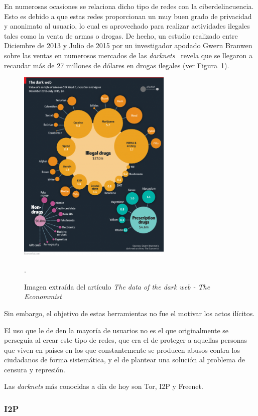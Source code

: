 En numerosas ocasiones se relaciona dicho tipo de redes con la ciberdelincuencia. Esto es debido a que estas redes proporcionan un muy buen grado de privacidad y anonimato al usuario, lo cual es aprovechado para realizar actividades ilegales tales como la venta de armas o drogas. 
De hecho, un estudio realizado entre Diciembre de 2013 y Julio de 2015 por un investigador apodado Gwern Branwen sobre las ventas en numerosos mercados de las \textit{darknets}~\cite{article:gwern} revela que se llegaron a recaudar más de 27 millones de dólares en drogas ilegales (ver Figura~\ref{fig:gwern}).

\begin{figure}[h]
	\centerline{
		\mbox{\includegraphics[width=2.90in]{images/darknet_markets.png}}
	}
	\caption{Imagen extraída del artículo \textit{The data of the dark web - The Econommist}~\cite{article:gwern}}.
	\label{fig:gwern}
\end{figure}

Sin embargo, el objetivo de estas herramientas no fue el motivar los actos ilícitos. 

El uso que le de den la mayoría de usuarios no es el que originalmente se perseguía al crear este tipo de redes, que era el de proteger a aquellas personas que viven en países en los que constantemente se producen abusos contra los ciudadanos de forma sistemática, y el de plantear una solución al problema de censura y represión.

Las \textit{darknets} más conocidas a día de hoy son Tor, I2P y Freenet.

\subsubsection {I2P}

